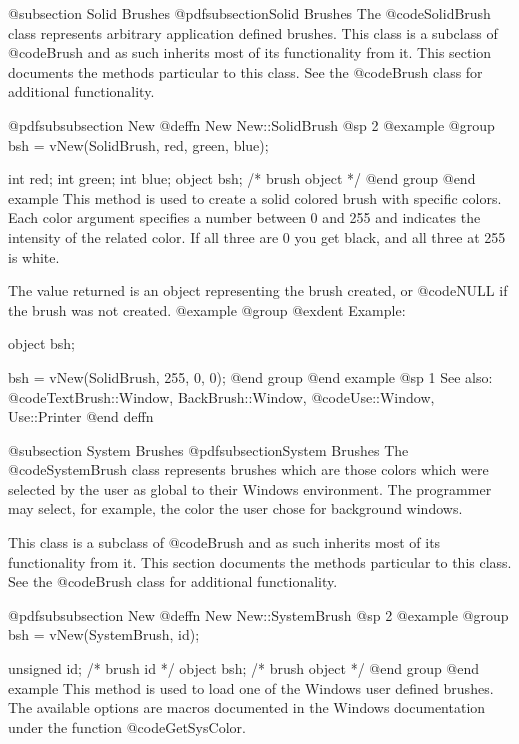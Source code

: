 @subsection Solid Brushes
@pdfsubsection{Solid Brushes}
The @code{SolidBrush} class represents arbitrary application defined
brushes.  This class is a subclass of @code{Brush} and as such inherits
most of its functionality from it.  This section documents the methods
particular to this class.  See the @code{Brush} class for additional
functionality.






@pdfsubsubsection {New}
@deffn {New} New::SolidBrush
@sp 2
@example
@group
bsh = vNew(SolidBrush, red, green, blue);

int     red;
int     green;
int     blue;
object  bsh;    /*  brush object  */
@end group
@end example
This method is used to create a solid colored brush with specific colors.
Each color argument specifies a number between 0 and 255 and indicates
the intensity of the related color.  If all three are 0 you get black,
and all three at 255 is white.

The value returned is an object representing the brush created, or
@code{NULL} if the brush was not created.
@example
@group
@exdent Example:

object  bsh;

bsh = vNew(SolidBrush, 255, 0, 0);
@end group
@end example
@sp 1
See also:  @code{TextBrush::Window, BackBrush::Window,}
        @code{Use::Window, Use::Printer}
@end deffn




@subsection System Brushes
@pdfsubsection{System Brushes}
The @code{SystemBrush} class represents brushes which are those colors
which were selected by the user as global to their Windows environment.
The programmer may select, for example, the color the user chose for
background windows.

This class is a subclass of @code{Brush} and as such inherits
most of its functionality from it.  This section documents the methods
particular to this class.  See the @code{Brush} class for additional
functionality.








@pdfsubsubsection {New}
@deffn {New} New::SystemBrush
@sp 2
@example
@group
bsh = vNew(SystemBrush, id);

unsigned id;    /*  brush id      */
object  bsh;    /*  brush object  */
@end group
@end example
This method is used to load one of the Windows user defined brushes.
The available options are macros documented in the Windows documentation
under the function @code{GetSysColor}.

